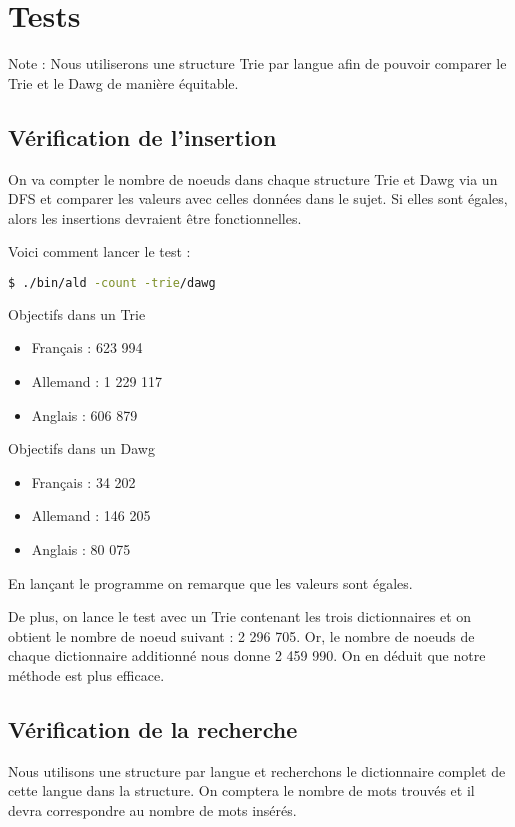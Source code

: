 \chapter{Tests}

Note : Nous utiliserons une structure Trie par langue afin de pouvoir comparer le Trie et le Dawg de manière équitable.

\section{Vérification de l'insertion}

On va compter le nombre de noeuds dans chaque structure Trie et Dawg via un DFS et comparer les valeurs avec celles données dans le sujet. Si elles sont égales, alors les insertions devraient être fonctionnelles.

Voici comment lancer le test :
\begin{lstlisting}[language=bash]
    $ ./bin/ald -count -trie/dawg
\end{lstlisting}

Objectifs dans un Trie
\begin{itemize}
\item Français : 623 994
\item Allemand : 1 229 117
\item Anglais : 606 879
\end{itemize}

Objectifs dans un Dawg
\begin{itemize}
\item Français : 34 202
\item Allemand : 146 205
\item Anglais : 80 075
\end{itemize}

En lançant le programme on remarque que les valeurs sont égales.

De plus, on lance le test avec un Trie contenant les trois dictionnaires et on obtient le nombre de noeud suivant : 2 296 705. \newline Or, le nombre de noeuds de chaque dictionnaire additionné nous donne 2 459 990. On en déduit que notre méthode est plus efficace.

\section{Vérification de la recherche}

Nous utilisons une structure par langue et recherchons le dictionnaire complet de cette langue dans la structure. On comptera le nombre de mots trouvés et il devra correspondre au nombre de mots insérés.

